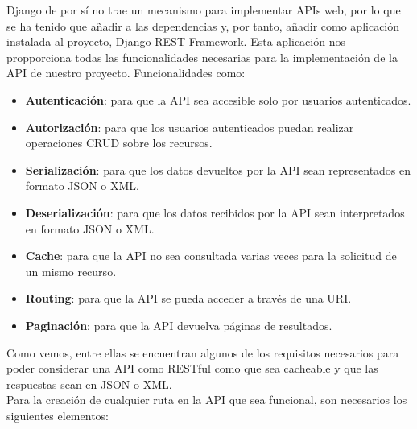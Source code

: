 Django de por sí no trae un mecanismo para implementar APIs web, por lo que se ha tenido
que añadir a las dependencias y, por tanto, añadir como aplicación instalada al proyecto,
Django REST Framework. Esta aplicación nos propporciona todas las funcionalidades
necesarias para la implementación de la API de nuestro proyecto. Funcionalidades como:

    \begin{itemize}
        \item \textbf{Autenticación}: para que la API sea accesible solo por usuarios
        autenticados.
        \item \textbf{Autorización}: para que los usuarios autenticados puedan realizar
        operaciones CRUD sobre los recursos.
        \item \textbf{Serialización}: para que los datos devueltos por la API sean
        representados en formato JSON o XML.
        \item \textbf{Deserialización}: para que los datos recibidos por la API sean
        interpretados en formato JSON o XML.
        \item \textbf{Cache}: para que la API no sea consultada varias veces para la
        solicitud de un mismo recurso.
        \item \textbf{Routing}: para que la API se pueda acceder a través de una URI.
        \item \textbf{Paginación}: para que la API devuelva páginas de resultados.
    \end{itemize}

Como vemos, entre ellas se encuentran algunos de los requisitos necesarios para poder
considerar una API como RESTful como que sea cacheable y que las respuestas sean en JSON
o XML.\\

Para la creación de cualquier ruta en la API que sea funcional, son necesarios los
siguientes elementos:


